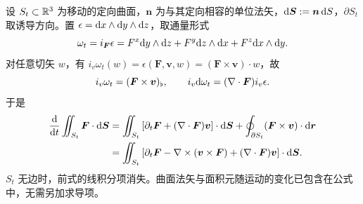 \begin{example}[矢量场的面积分]
    设 $S_t\subset\mathbb{R}^3$ 为移动的定向曲面，$\bm n$ 为与其定向相容的单位法矢，$\dd\bm S:=\bm n\,\dd S$，$\partial S_t$ 取诱导方向。置 $\epsilon=\dd x\wedge\dd y\wedge\dd z$，取通量形式
    \[\omega_t=i_{\bm F}\epsilon
        =F^x\dd y\wedge\dd z+F^y\dd z\wedge\dd x+F^z\dd x\wedge\dd y.\]
    对任意切矢 $w$，有 $i_v\omega_t(w)=\epsilon(\bm F,\bm v,w)=(\bm F\times\bm v)\cdot w$，故
    \[i_v\omega_t=(\bm F\times\bm v)_\flat,\qquad
        i_v\dd\omega_t=(\nabla\cdot\bm F)i_v\epsilon.\]
    于是
    \begin{align*}
        \dv{t}\iint_{S_t}\bm F\cdot\dd\bm S
        &=\iint_{S_t}\left[\partial_t\bm F+(\nabla\cdot\bm F)\bm v\right]\cdot\dd\bm S+\oint_{\partial S_t}(\bm F\times\bm v)\cdot\dd\bm r\\
        &=\iint_{S_t}\left[\partial_t\bm F-\nabla\times(\bm v\times\bm F)
          +(\nabla\cdot\bm F)\bm v\right]\cdot\dd\bm S.
    \end{align*}
    $S_t$ 无边时，前式的线积分项消失。曲面法矢与面积元随运动的变化已包含在公式中，无需另加求导项。
\end{example}

